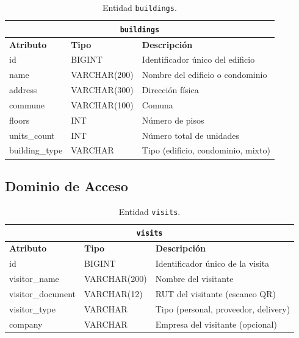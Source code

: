 \begin{table}[H]
\centering
\small
\begin{tabular}{|p{}|p{}|p{}|}
\hline
\multicolumn{3}{|c|}{\textbf{\texttt{buildings}}} \\ \hline
\textbf{Atributo} & \textbf{Tipo} & \textbf{Descripción} \\ \hline
id & BIGINT & Identificador único del edificio \\ \hline
name & VARCHAR(200) & Nombre del edificio o condominio \\ \hline
address & VARCHAR(300) & Dirección física \\ \hline
commune & VARCHAR(100) & Comuna \\ \hline
floors & INT & Número de pisos \\ \hline
units\_count & INT & Número total de unidades \\ \hline
building\_type & VARCHAR & Tipo (edificio, condominio, mixto) \\ \hline
\end{tabular}
\caption{Entidad \texttt{buildings}.}
\end{table}

\subsection{Dominio de Acceso}

\begin{table}[H]
\centering
\small
\begin{tabular}{|p{}|p{}|p{}|}
\hline
\multicolumn{3}{|c|}{\textbf{\texttt{visits}}} \\ \hline
\textbf{Atributo} & \textbf{Tipo} & \textbf{Descripción} \\ \hline
id & BIGINT & Identificador único de la visita \\ \hline
visitor\_name & VARCHAR(200) & Nombre del visitante \\ \hline
visitor\_document & VARCHAR(12) & RUT del visitante (escaneo QR) \\ \hline
visitor\_type & VARCHAR & Tipo (personal, proveedor, delivery) \\ \hline
company & VARCHAR & Empresa del visitante (opcional) \\ \hline
\end{tabular}
\caption{Entidad \texttt{visits}.}
\end{table}

